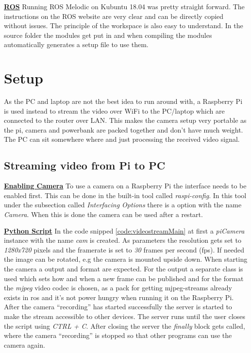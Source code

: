 \textbf{\underline{ROS}} \newline
Running ROS Melodic on Kubuntu 18.04 was pretty straight forward. The instructions on the ROS website are very clear and can be directly copied without issues. The principle of the workspace is also easy to understand. In the source folder the modules get put in and when compiling the modules automatically generates a setup file to use them.

\section{Setup\authorA}
As the PC and laptop are not the best idea to run around with, a Raspberry Pi is used instead to stream the video over WiFi to the PC/laptop which are connected to the router over LAN. This makes the camera setup very portable as the pi, camera and powerbank are packed together and don't have much weight. The PC can sit somewhere where and just processing the received video signal.

\subsection{Streaming video from Pi to PC}

\textbf{\underline{Enabling Camera}}\newline
To use a camera on a Raspberry Pi the interface needs to be enabled first. This can be done in the built-in tool called \textit{raspi-config}. In this tool under the subsection called \textit{Interfacing Options} there is a option with the name \textit{Camera}. When this is done the camera can be used after a restart.

\textbf{\underline{Python Script}}\newline
In the code snipped \ref{code:videostreamMain} at first a \textit{piCamera} instance with the name \textit{cam} is created. As parameters the resolution gets set to \textit{1280x720} pixels and the framerate is set to \textit{30} frames per second (\gls{fps}). If needed the image can be rotated, e.g the camera is mounted upside down. When starting the camera a output and format are expected. For the output a separate class is used which sets how and when a new frame can be published and for the format the \textit{mjpeg} video codec is chosen, as a pack for getting mjpeg-streams already exists in \gls{ros} and it's not power hungry when running it on the Raspberry Pi. \newline
After the camera \enquote{recording} has started successfully the server is started to make the stream accessible to other devices. The server runs until the user closes the script using \textit{CTRL + C}. After closing the server the \textit{finally} block gets called, where the camera \enquote{recording} is stopped so that other programs can use the camera again. \newline

